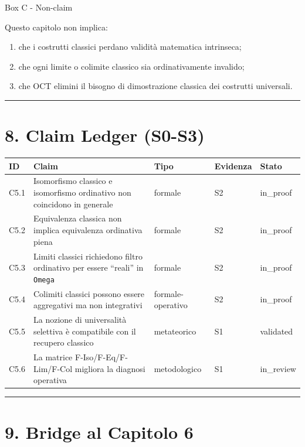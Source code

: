 Box C - Non-claim

Questo capitolo non implica:

\begin{enumerate}
\def\labelenumi{\arabic{enumi}.}
\tightlist
\item
  che i costrutti classici perdano validità matematica intrinseca;
\item
  che ogni limite o colimite classico sia ordinativamente invalido;
\item
  che OCT elimini il bisogno di dimostrazione classica dei costrutti universali.
\end{enumerate}

\begin{center}\rule{0.5\linewidth}{0.5pt}\end{center}

\section{8. Claim Ledger (S0-S3)}

{\def\LTcaptype{none} %
\begin{longtable}[]{@{}lllll@{}}
\toprule\noalign{}
ID & Claim & Tipo & Evidenza & Stato \\
\midrule\noalign{}
\endhead
\bottomrule\noalign{}
\endlastfoot
C5.1 & Isomorfismo classico e isomorfismo ordinativo non coincidono in generale & formale & S2 & in\_proof \\
C5.2 & Equivalenza classica non implica equivalenza ordinativa piena & formale & S2 & in\_proof \\
C5.3 & Limiti classici richiedono filtro ordinativo per essere ``reali'' in \texttt{Omega} & formale & S2 & in\_proof \\
C5.4 & Colimiti classici possono essere aggregativi ma non integrativi & formale-operativo & S2 & in\_proof \\
C5.5 & La nozione di universalità selettiva è compatibile con il recupero classico & metateorico & S1 & validated \\
C5.6 & La matrice F-Iso/F-Eq/F-Lim/F-Col migliora la diagnosi operativa & metodologico & S1 & in\_review \\
\end{longtable}
}

\begin{center}\rule{0.5\linewidth}{0.5pt}\end{center}

\section{9. Bridge al Capitolo 6}

